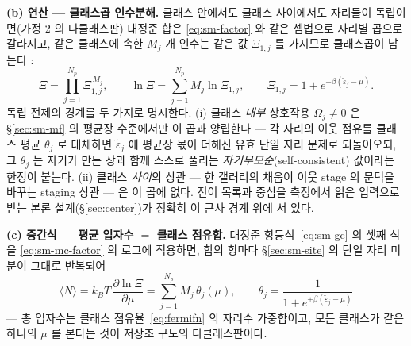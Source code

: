 \textbf{(b) 연산 --- 클래스곱 인수분해.} 클래스 안에서도 클래스 사이에서도 자리들이 독립이면(가정 2 의
다클래스판) 대정준 합은 \eqref{eq:sm-factor} 와 같은 셈법으로 자리별 곱으로 갈라지고, 같은 클래스에 속한
$M_j$ 개 인수는 같은 값 $\Xi_{1,j}$ 를 가지므로 클래스곱이 남는다 \cite{hill1960}:
\begin{equation}
\Xi=\prod_{j=1}^{N_p}\Xi_{1,j}^{\,M_j},\qquad
\ln\Xi=\sum_{j=1}^{N_p}M_j\ln\Xi_{1,j},\qquad
\Xi_{1,j}=1+e^{-\beta(\tilde\varepsilon_j-\mu)}.
\label{eq:sm-mc-factor}
\end{equation}
독립 전제의 경계를 두 가지로 명시한다. (i) 클래스 \emph{내부} 상호작용 $\Omega_j\ne0$ 은 \S\ref{sec:sm-mf}
의 평균장 수준에서만 이 곱과 양립한다 --- 각 자리의 이웃 점유를 클래스 평균 $\theta_j$ 로 대체하면
$\tilde\varepsilon_j$ 에 평균장 몫이 더해진 유효 단일 자리 문제로 되돌아오되, 그 $\theta_j$ 는 자기가 만든
장과 함께 스스로 풀리는 \emph{자기무모순}(self-consistent) 값이라는 한정이 붙는다. (ii) 클래스 \emph{사이}의
상관 --- 한 갤러리의 채움이 이웃 stage 의 문턱을 바꾸는 staging 상관 --- 은 이 곱에 없다. 전이 목록과
중심을 측정에서 읽은 입력으로 받는 본론 설계(\S\ref{sec:center})가 정확히 이 근사 경계 위에 서 있다.

\textbf{(c) 중간식 --- 평균 입자수 $=$ 클래스 점유합.} 대정준 항등식~\eqref{eq:sm-gc} 의 셋째 식을
\eqref{eq:sm-mc-factor} 의 로그에 적용하면, 합의 항마다 \S\ref{sec:sm-site} 의 단일 자리 미분이 그대로
반복되어
\begin{equation}
\langle N\rangle=k_BT\,\frac{\partial\ln\Xi}{\partial\mu}
=\sum_{j=1}^{N_p}M_j\,\theta_j(\mu),\qquad
\theta_j=\frac{1}{1+e^{+\beta(\tilde\varepsilon_j-\mu)}}
\label{eq:sm-mc-N}
\end{equation}
--- 총 입자수는 클래스 점유율~\eqref{eq:fermifn} 의 자리수 가중합이고, 모든 클래스가 같은 하나의 $\mu$ 를
본다는 것이 저장조 구도의 다클래스판이다.

